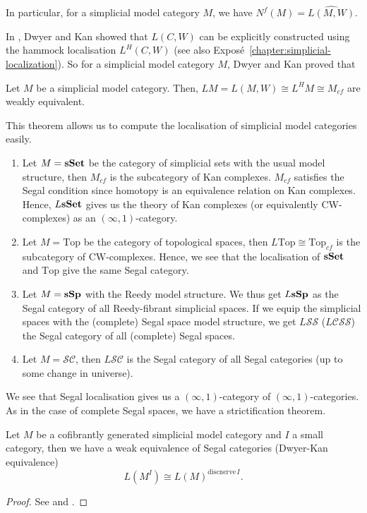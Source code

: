 \begin{refsection}
In particular, for a simplicial model category $M$, we have $N^f(M)=\widehat{L(M,W)}$.

In \cite{dwyer-kan-calculating-simplicial-localizations}, Dwyer and Kan showed that $L(C,W)$ can be explicitly constructed using the hammock localisation $L^H(C,W)$ (see also Expos\'e~\ref{chapter:simplicial-localization}). So for a simplicial model category $M$, Dwyer and Kan proved that

\begin{thm}
Let $M$ be a simplicial model category. Then, $LM=L(M,W)\cong L^HM\cong M_{cf}$ are weakly equivalent.
\end{thm}

This theorem allows us to compute the localisation of simplicial model categories easily.
\begin{eg}
\begin{enumerate}
\item Let $M=\mathbf{sSet}$ be the category of simplicial sets with the usual model structure, then $M_{cf}$ is the subcategory of Kan complexes. $M_{cf}$ satisfies the Segal condition since homotopy is an equivalence relation on Kan complexes. Hence, $L\mathbf{sSet}$ gives us the theory of Kan complexes (or equivalently CW-complexes) as an $(\infty,1)$-category.
\item Let $M=\mathrm{Top}$ be the category of topological spaces, then $L\mathrm{Top}\cong\mathrm{Top}_{cf}$ is the subcategory of CW-complexes. Hence, we see that the localisation of $\mathbf{sSet}$ and $\mathrm{Top}$ give the same Segal category.
\item Let $M=\mathbf{sSp}$ with the Reedy model structure. We thus get $L\mathbf{sSp}$ as the Segal category of all Reedy-fibrant simplicial spaces. If we equip the simplicial spaces with the (complete) Segal space model structure, we get $L\mathcal{SS}$ ($L\mathcal{CSS}$) the Segal category of all (complete) Segal spaces.
\item Let $M=\mathcal{SC}$, then $L\mathcal{SC}$ is the Segal category of all Segal categories (up to some change in universe).
\end{enumerate}
\end{eg}
We see that Segal localisation gives us a $(\infty,1)$-category of $(\infty,1)$-categories. As in the case of complete Segal spaces, we have a strictification theorem.

\begin{thm}
Let $M$ be a cofibrantly generated simplicial model category and $I$ a small category, then we have a weak equivalence of Segal categories (Dwyer-Kan equivalence)
$$L(M^I)\cong L(M)^{\mathrm{discnerve}\,I}.$$
\end{thm}
\begin{proof}
See \cite{hirschowitz-simpson-descente-pour-les-n-champs} and \cite{toen-vezzosi-segal-topoi-and-stacks-over-segal-categories}.
\end{proof}


\end{refsection}
